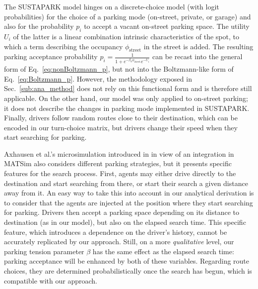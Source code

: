 \documentclass[trsc,reprint]{informs3}
\begin{document}
\begin{APPENDICES}
{The SUSTAPARK model \cite{dieussaert2009sustapark} hinges on a discrete-choice model (with 
logit probabilities) for the choice of a parking mode (on-street, private, or garage) and also
for the probability $p_i$ to accept a vacant on-street parking space. The utility $U_i$ of the latter
is a linear combination intrinsic characteristics of the spot, to which a term describing the  occupancy $\phi_{\mathrm{street}}$ in the street is added. The resulting parking acceptance probability $p_i=\frac{1}{1+e^{-\beta_{\phi}\phi_{\mathrm{street}}}e^{-U_i}}$ can be recast into
the general form of Eq.~\ref{eq:nonBoltzmann_p}, but not
into the Boltzmann-like form of Eq.~\ref{eq:Boltzmann_p}. However, the methodology exposed in Sec.~\ref{sub:ana_method} does not rely on this functional form and is therefore still applicable.
On the other hand, our model was only applied to on-street parking; it does not
describe the changes in parking mode implemented in SUSTAPARK.
Finally, drivers follow random routes close to their destination, which can be encoded in our
turn-choice matrix, but drivers change their speed when they start searching for parking.

Axhausen et al.'s microsimulation introduced in \cite{horni2013agent} in view of an integration in MATSim also considers different parking strategies, but it presents specific features for
the search process. First, agents may either drive directly to the destination and start
searching from there, or start their search a given distance away from it. An easy way to
take this into account in our analytical derivation is to consider that the agents are injected
at the position where they start searching for parking. Drivers then accept a parking space
depending on its distance to destination (as in our model), but also on the elapsed search time.
This specific feature, which introduces a dependence on the driver's history, cannot be accurately replicated by our approach. Still, on a more \emph{qualitative} level, our parking tension parameter
$\beta$ has the same effect as the elapsed search time: parking acceptance will be
enhanced by both of these variables. Regarding route choices, they are determined probabilistically once the search has begun, which is compatible with our approach.

}
\end{APPENDICES}
\end{document}
